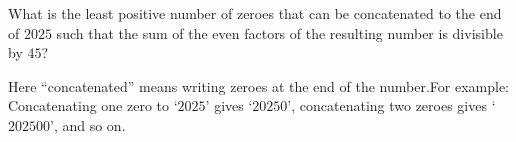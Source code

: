 What is the least positive number of zeroes that can be concatenated to the end of $2025$ such that the sum of the even factors of the resulting number is divisible by $45$?

Here ``concatenated'' means writing zeroes at the end of the number.For example: Concatenating one zero to `$2025$' gives `$20250$', concatenating two zeroes gives `$202500$', and so on.
